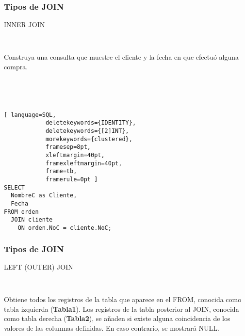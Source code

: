 
\begin{frame}[fragile]
	
	\frametitle{Tipos de JOIN}
	
	\begin{center}
		\textcolor{codepurple}{INNER JOIN}
	\end{center}
	
	\ 
		
	Construya una consulta que muestre el cliente y la fecha en que efectuó alguna compra.
		
		\pause 
		
		\ 
		
		\ 
		
		\begin{lstlisting}[ language=SQL,
			deletekeywords={IDENTITY},
			deletekeywords={[2]INT},
			morekeywords={clustered},
			framesep=8pt,
			xleftmargin=40pt,
			framexleftmargin=40pt,
			frame=tb,
			framerule=0pt ]
SELECT 
  NombreC as Cliente, 
  Fecha
FROM orden 
  JOIN cliente
    ON orden.NoC = cliente.NoC;
\end{lstlisting}
				
\end{frame}


\begin{frame}[fragile]
	
	\frametitle{Tipos de JOIN}
	
	\begin{center}
	
		\textcolor{codepurple}{LEFT (OUTER) JOIN}
		
		\ 
		
		Obtiene todos los registros de la tabla que aparece en el \textcolor{codepurple}{FROM}, conocida como tabla izquierda (\textbf{Tabla1}). Los registros de la tabla posterior al \textcolor{codepurple}{JOIN}, conocida como tabla derecha (\textbf{Tabla2}), se añaden si existe alguna coincidencia de los valores de las columnas definidas. En caso contrario, se mostrará \textcolor{codepurple}{NULL}.
		
		\begin{venndiagram2sets}[
			labelA={ }, labelOnlyA={Tabla1}, 
			labelB={ }, labelOnlyB={Tabla2}, 
			showframe=false]
			\fillA
		\end{venndiagram2sets}
		
	\end{center}

\end{frame}
	

